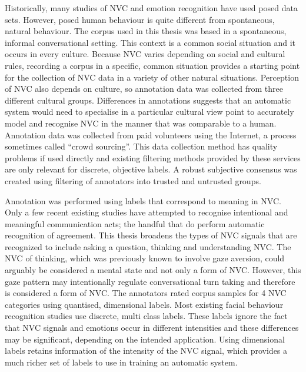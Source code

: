 Historically, many studies of \ac{NVC} and emotion recognition have used posed data sets. However, posed human behaviour is quite different from spontaneous, natural behaviour. The corpus used in this thesis was based in a spontaneous, informal conversational setting. This context is a common social situation and it occurs in every culture. Because \ac{NVC} varies depending on social and cultural rules, recording a corpus in a specific, common situation provides a starting point for the collection of \ac{NVC} data in a variety of other natural situations. Perception of \ac{NVC} also depends on culture, so annotation data was collected from three different cultural groups. Differences in annotations suggests that an automatic system would need to specialise in a particular cultural view point to accurately model and recognise \ac{NVC} in the manner that was comparable to a human. Annotation data was collected from paid volunteers using the Internet, a process sometimes called ``crowd sourcing''. This data collection method has quality problems if used directly and existing filtering methods provided by these services are only relevant for discrete, objective labels. A robust subjective consensus was created using filtering of annotators into trusted and untrusted groups.

Annotation was performed using labels that correspond to meaning in \ac{NVC}. Only a few recent existing studies have attempted to recognise intentional and meaningful communication acts; the handful that do perform automatic recognition of agreement. This thesis broadens the types of \ac{NVC} signals that are recognized to include asking a question, thinking and understanding \ac{NVC}. The \ac{NVC} of thinking, which was previously known to involve gaze aversion, could arguably be considered a mental state and not only a form of \ac{NVC}. However, this gaze pattern may intentionally regulate conversational turn taking and therefore is considered a form of \ac{NVC}. The annotators rated corpus samples for 4 \ac{NVC} categories using quantised, dimensional labels. Most existing facial behaviour recognition studies use discrete, multi class labels. These labels ignore the fact that \ac{NVC} signals and emotions occur in different intensities and these differences may be significant, depending on the intended application. Using dimensional labels retains information of the intensity of the \ac{NVC} signal, which provides a much richer set of labels to use in training an automatic system. 

